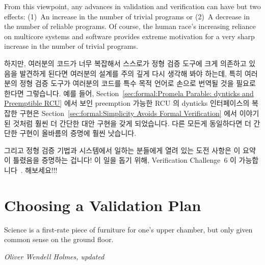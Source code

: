 From this viewpoint, any advances in validation and verification can
have but two effects: (1)~An increase in the number of trivial programs or
(2)~A decrease in the number of reliable programs.
Of course, the human race's increasing reliance on multicore systems and
software provides extreme motivation for a very sharp increase in the
number of trivial programs.

\fi

하지만, 여러분의 코드가 너무 복잡해서 스스로가 정형 검증 도구에 크게 의존하고
있음을 발견하게 된다면 여러분의 설계를 주의 깊게 다시 생각해 봐야 하는데, 특히
여러분의 정형 검증 도구가 여러분의 코드를 특수 목적 언어로 손으로 번역될 것을
필요로 한다면 그렇습니다.
예를 들어,
Section~\ref{sec:formal:Promela Parable: dynticks and Preemptible RCU}
에서 보인 preemption 가능한 RCU 의 dynticks 인터페이스의 복잡한 구현은
Section~\ref{sec:formal:Simplicity Avoids Formal Verification}
에서 이야기 된 것처럼 훨씬 더 간단한 대안 구현을 갖게 되었습니다.
다른 모든게 동일하다면 더 간단한 구현이 올바름의 증명에 훨씬 낫습니다.

그리고 정형 검증 기법과 시스템에서 일하는 분들에게 열려 있는 도전 사항은 이
요약이 틀렸음을 증명하는 겁니다!
이 일을 돕기 위해, Verification Challenge~6 이
가능합니다~\cite{PaulEMcKenney2017VerificationChallenge6}.
해보세요!!!

\iffalse

However, if your code is so complex that you find yourself
relying too heavily on formal-verification
tools, you should carefully rethink your design, especially if your
formal-verification tools require your code to be hand-translated
to a special-purpose language.
For example, a complex implementation of the dynticks interface for
preemptible RCU that was presented in
Section~\ref{sec:formal:Promela Parable: dynticks and Preemptible RCU}
turned out to
have a much simpler alternative implementation, as discussed in
Section~\ref{sec:formal:Simplicity Avoids Formal Verification}.
All else being equal, a simpler implementation is much better than
a proof of correctness for a complex implementation.

And the open challenge to those working on formal verification techniques
and systems is to prove this summary wrong!
To assist in this task, Verification Challenge~6 is now
available~\cite{PaulEMcKenney2017VerificationChallenge6}.
Have at it!!!

\fi

\section{Choosing a Validation Plan}
\label{sec:formal:Choosing a Validation Plan}
%
\epigraph{Science is a first-rate piece of furniture for one's upper
	  chamber, but only given common sense on the ground floor.}
	 {\emph{Oliver Wendell Holmes, updated}}

